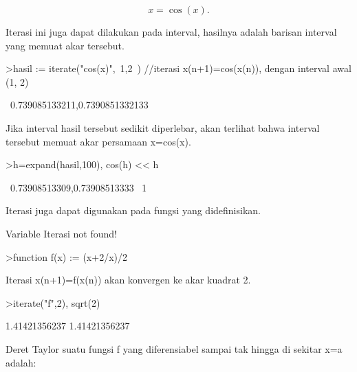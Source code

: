 \documentclass[a4paper,10pt]{article}
\begin{document}
\begin{eulernotebook}
\begin{eulercomment}
\begin{eulercomment}
\begin{eulercomment}
\begin{eulercomment}
\begin{eulercomment}
\end{eulercomment}
\begin{eulerformula}
\[
x = \cos(x).
\]
\end{eulerformula}
\begin{eulercomment}
Iterasi ini juga dapat dilakukan pada interval, hasilnya adalah
barisan interval yang memuat akar tersebut.
\end{eulercomment}
\begin{eulerprompt}
>hasil := iterate("cos(x)",~1,2~) //iterasi x(n+1)=cos(x(n)), dengan interval awal (1, 2)
\end{eulerprompt}
\begin{euleroutput}
  ~0.739085133211,0.7390851332133~
\end{euleroutput}
\begin{eulercomment}
Jika interval hasil tersebut sedikit diperlebar, akan terlihat bahwa
interval tersebut memuat akar persamaan x=cos(x).
\end{eulercomment}
\begin{eulerprompt}
>h=expand(hasil,100), cos(h) << h
\end{eulerprompt}
\begin{euleroutput}
  ~0.73908513309,0.73908513333~
  1
\end{euleroutput}
\begin{eulercomment}
Iterasi juga dapat digunakan pada fungsi yang didefinisikan.\\
\end{eulercomment}
\begin{eulerttcomment}
 Variable Iterasi not found!
\end{eulerttcomment}
\begin{eulerprompt}
>function f(x) := (x+2/x)/2
\end{eulerprompt}
\begin{eulercomment}
Iterasi x(n+1)=f(x(n)) akan konvergen ke akar kuadrat 2.
\end{eulercomment}
\begin{eulerprompt}
>iterate("f",2), sqrt(2)
\end{eulerprompt}
\begin{euleroutput}
  1.41421356237
  1.41421356237
\end{euleroutput}
\begin{eulercomment}
Deret Taylor suatu fungsi f yang diferensiabel sampai tak hingga di
sekitar x=a adalah:


\end{eulercomment}
\end{eulercomment}
\end{eulercomment}
\end{eulercomment}
\end{eulercomment}
\end{eulernotebook}
\end{document}
